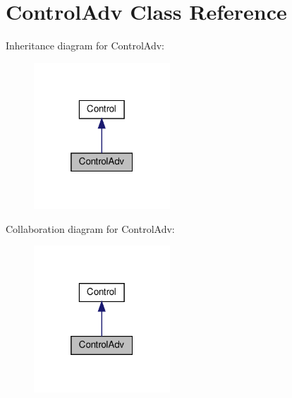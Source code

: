 \hypertarget{classControlAdv}{}\section{Control\+Adv Class Reference}
\label{classControlAdv}


Inheritance diagram for Control\+Adv\+:\nopagebreak
\begin{figure}[H]
\begin{center}
\leavevmode
\includegraphics[width=145pt]{classControlAdv__inherit__graph}
\end{center}
\end{figure}


Collaboration diagram for Control\+Adv\+:\nopagebreak
\begin{figure}[H]
\begin{center}
\leavevmode
\includegraphics[width=145pt]{classControlAdv__coll__graph}
\end{center}
\end{figure}
